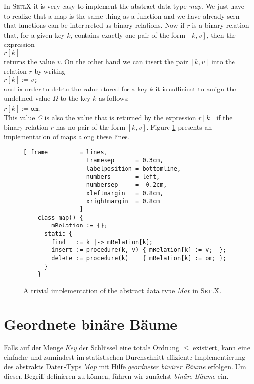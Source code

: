 In \textsc{SetlX} it is very easy to implement the abstract data type  \textsl{map}.  We just have
to realize that a map is the same thing as a function and we have already seen that functions can
be interpreted as binary relations.
Now if $r$ is a binary relation that, for a given key $k$,  contains exactly one pair of the form
$[k,v]$, then the expression
\\[0.1cm]
\hspace*{1.3cm} $r[k]$
\\[0.1cm]
returns the value $v$.  On the other hand we can insert the pair $[k,v]$ into the relation $r$ by
writing
\\[0.1cm]
\hspace*{1.3cm} $r[k] := v$\texttt{;} \\[0.1cm]
and in order to delete the value stored for a key  $k$ it is sufficient to assign the undefined value
$\Omega$ to the key $k$ as follows: \\[0.1cm]
\hspace*{1.3cm} $r[k] := \mathtt{om;}$. \\[0.1cm]
This value $\Omega$ is also the value that is returned by the expression  $r[k]$ if
the binary  relation $r$ has no pair of the form $[k,v]$.
Figure  \ref{fig:map-trivial.stlx} presents an implementation of maps along these lines.


\begin{figure}[!ht]
  \centering
\begin{Verbatim}[ frame         = lines, 
                  framesep      = 0.3cm, 
                  labelposition = bottomline,
                  numbers       = left,
                  numbersep     = -0.2cm,
                  xleftmargin   = 0.8cm,
                  xrightmargin  = 0.8cm
                ]
    class map() {
        mRelation := {};
      static {
        find   := k |-> mRelation[k];
        insert := procedure(k, v) { mRelation[k] := v;  };
        delete := procedure(k)    { mRelation[k] := om; };
      }
    }
\end{Verbatim}
\vspace*{-0.3cm}
  \caption{A trivial implementation of the abstract data type \textsl{Map} in \textsc{SetlX}.}
  \label{fig:map-trivial.stlx}
\end{figure} 


\section{Geordnete bin\"are B\"aume}
Falls auf der Menge \textsl{Key} der Schl\"ussel eine totale Ordnung $\leq$ existiert, kann
eine einfache und zumindest im statistischen Durchschnitt effiziente Implementierung des
abstrakte Daten-Typs \textsl{Map} mit Hilfe \emph{geordneter bin\"arer B\"aume} erfolgen.
Um diesen Begriff definieren zu k\"onnen, f\"uhren wir zun\"achst \emph{bin\"are B\"aume} ein.

